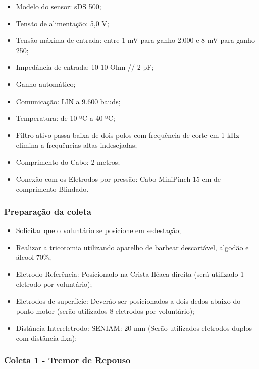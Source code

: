 \documentclass[a4paper,12pt]{report}
\begin{document}
\begin{itemize}
\item     Modelo do sensor: sDS 500;
\item     Tensão de alimentação: 5,0 V;
\item     Tensão máxima de entrada: entre 1 mV para ganho 2.000 e 8 mV para ganho 250;
\item     Impedância de entrada: 10 10 Ohm // 2 pF;
\item     Ganho automático;
\item     Comunicação: LIN a 9.600 bauds;
\item     Temperatura: de 10 ºC a 40 ºC;
\item     Filtro ativo passa-baixa de dois polos com frequência de corte em 1 kHz elimina a frequências altas indesejadas;
\item     Comprimento do Cabo: 2 metros;
\item     Conexão com os Eletrodos por pressão: Cabo MiniPinch 15 cm de comprimento Blindado.
\end{itemize}

\subsubsection*{Preparação da coleta}


\begin{itemize}
\item Solicitar que o voluntário se posicione em sedestação;
\item Realizar a tricotomia utilizando aparelho de barbear descartável, algodão e álcool 70\%;
\end{itemize}


\begin{itemize}
\item Eletrodo Referência: Posicionado na Crista Iléaca direita (será utilizado 1 eletrodo por voluntário);
\item Eletrodos de superfície: Deveráo ser posicionados a dois dedos abaixo do ponto motor (serão utilizados 8 eletrodos por voluntário);
\item Distância Intereletrodo: SENIAM: 20 mm (Serão utilizados eletrodos duplos com distância fixa);
\end{itemize}


\subsubsection*{Coleta 1 - Tremor de Repouso}
\end{document}
